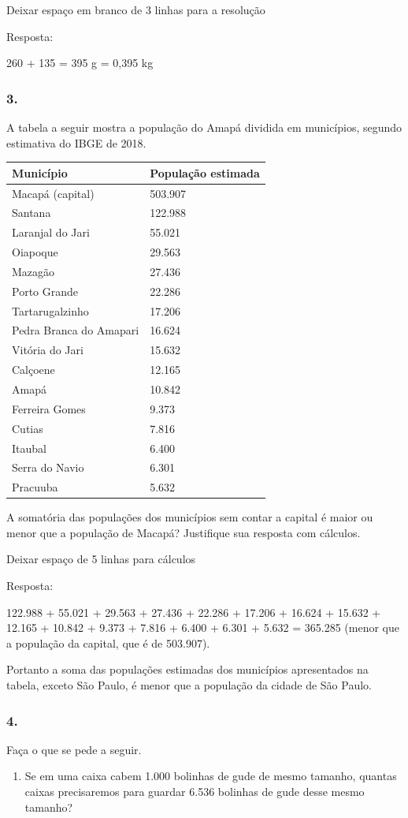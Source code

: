 \begin{enumerate}
Deixar espaço em branco de 3 linhas para a resolução

Resposta:

260 + 135 = 395 g = 0,395 kg

\subsubsection{3.}\label{section-15}

A tabela a seguir mostra a população do Amapá dividida em municípios, segundo estimativa do IBGE de 2018.

\begin{longtable}[]{@{}ll@{}}
\toprule
Município & População estimada\tabularnewline
\midrule
\endhead
Macapá (capital) & 503.907\tabularnewline
Santana & 122.988\tabularnewline
Laranjal do Jari & 55.021\tabularnewline
Oiapoque & 29.563\tabularnewline
Mazagão & 27.436\tabularnewline
Porto Grande & 22.286\tabularnewline
Tartarugalzinho & 17.206\tabularnewline
Pedra Branca do Amapari & 16.624\tabularnewline
Vitória do Jari & 15.632\tabularnewline
Calçoene & 12.165\tabularnewline
Amapá & 10.842\tabularnewline
Ferreira Gomes & 9.373\tabularnewline
Cutias & 7.816\tabularnewline
Itaubal & 6.400\tabularnewline
Serra do Navio & 6.301\tabularnewline
Pracuuba & 5.632\tabularnewline
\bottomrule
\end{longtable}

A somatória das populações dos municípios sem contar a capital é maior ou menor que a população de Macapá? Justifique sua resposta com cálculos.

Deixar espaço de 5 linhas para cálculos

Resposta:

122.988 + 55.021 + 29.563 + 27.436 + 22.286 + 17.206 + 16.624 + 15.632 + 12.165 + 10.842 + 9.373 + 7.816 + 6.400 + 6.301 + 5.632 = 365.285 (menor que a população da capital, que é de 503.907).

Portanto a soma das populações estimadas dos municípios apresentados na
tabela, exceto São Paulo, é menor que a população da cidade de São
Paulo.

\subsubsection{4.}\label{section-16}

Faça o que se pede a seguir.

\begin{enumerate}
\def\labelenumi{\alph{enumi})}
\item
  Se em uma caixa cabem 1.000 bolinhas de gude de mesmo tamanho, quantas
  caixas precisaremos para guardar 6.536 bolinhas de gude desse mesmo
  tamanho?
\end{enumerate}


\end{enumerate}
